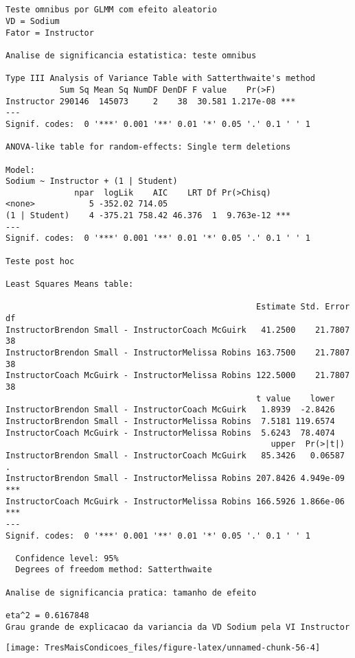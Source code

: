 \documentclass[]{article}
\begin{document}
\begin{verbatim}


Teste omnibus por GLMM com efeito aleatorio
VD = Sodium 
Fator = Instructor 

Analise de significancia estatistica: teste omnibus

Type III Analysis of Variance Table with Satterthwaite's method
           Sum Sq Mean Sq NumDF DenDF F value    Pr(>F)    
Instructor 290146  145073     2    38  30.581 1.217e-08 ***
---
Signif. codes:  0 '***' 0.001 '**' 0.01 '*' 0.05 '.' 0.1 ' ' 1

ANOVA-like table for random-effects: Single term deletions

Model:
Sodium ~ Instructor + (1 | Student)
              npar  logLik    AIC    LRT Df Pr(>Chisq)    
<none>           5 -352.02 714.05                         
(1 | Student)    4 -375.21 758.42 46.376  1  9.763e-12 ***
---
Signif. codes:  0 '***' 0.001 '**' 0.01 '*' 0.05 '.' 0.1 ' ' 1

Teste post hoc

Least Squares Means table:

                                                   Estimate Std. Error df
InstructorBrendon Small - InstructorCoach McGuirk   41.2500    21.7807 38
InstructorBrendon Small - InstructorMelissa Robins 163.7500    21.7807 38
InstructorCoach McGuirk - InstructorMelissa Robins 122.5000    21.7807 38
                                                   t value    lower
InstructorBrendon Small - InstructorCoach McGuirk   1.8939  -2.8426
InstructorBrendon Small - InstructorMelissa Robins  7.5181 119.6574
InstructorCoach McGuirk - InstructorMelissa Robins  5.6243  78.4074
                                                      upper  Pr(>|t|)    
InstructorBrendon Small - InstructorCoach McGuirk   85.3426   0.06587 .  
InstructorBrendon Small - InstructorMelissa Robins 207.8426 4.949e-09 ***
InstructorCoach McGuirk - InstructorMelissa Robins 166.5926 1.866e-06 ***
---
Signif. codes:  0 '***' 0.001 '**' 0.01 '*' 0.05 '.' 0.1 ' ' 1

  Confidence level: 95%
  Degrees of freedom method: Satterthwaite 

Analise de significancia pratica: tamanho de efeito

eta^2 = 0.6167848 
Grau grande de explicacao da variancia da VD Sodium pela VI Instructor 
\end{verbatim}

\begin{center}\texttt{[image: TresMaisCondicoes\_files/figure-latex/unnamed-chunk-56-4]} \end{center}
\end{document}
